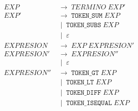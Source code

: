 \documentclass[12pt, letterpaper]{article}
\theoremstyle{definition}
\newcommand{\produce}{\;\longrightarrow\;}
\newcommand{\OR}{\;\mid\;}
\begin{document}
{\begin{align}
    \mathit{EXP} &\produce \mathit{TERMINO} \; \mathit{EXP'} \label{p:exp}  \\[3pt]
    \mathit{EXP'} & \produce \texttt{TOKEN\_SUM} \; \mathit{EXP}\\
                    & \OR \texttt{TOKEN\_SUBS} \; \mathit{EXP}  \nonumber\\                    
                    & \OR \varepsilon  \nonumber\\[3pt]  
    \mathit{EXPRESION} &\produce \mathit{EXP}\; \mathit{EXPRESION'}\; \\[3pt]   
    \mathit{EXPRESION'} &\produce \mathit{EXPRESION''} \\
                       & \OR \varepsilon   \nonumber \\[3pt]  
    \mathit{EXPRESION''} &\produce \texttt{TOKEN\_GT}\; \mathit{EXP} \\
                        & \OR \texttt{TOKEN\_LT}\; \mathit{EXP} \nonumber \\
                        & \OR \texttt{TOKEN\_DIFF}\; \mathit{EXP}  \nonumber \\
                        & \OR \texttt{TOKEN\_ISEQUAL}\; \mathit{EXP} \nonumber  \\ \nonumber
\end{align}}
\end{document}
